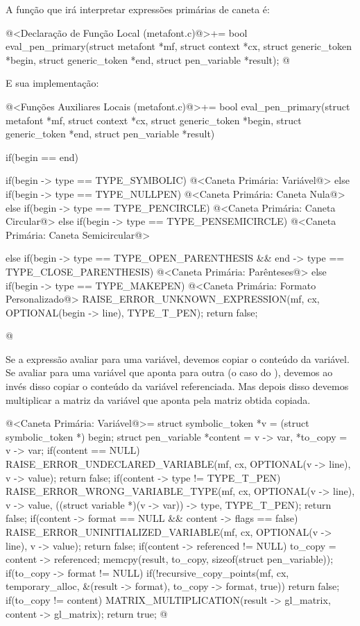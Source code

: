 {{{{{{A função que irá interpretar expressões primárias de caneta é:

\iniciocodigo
@<Declaração de Função Local (metafont.c)@>+=
bool eval_pen_primary(struct metafont *mf, struct context *cx,
                      struct generic_token *begin,
                      struct generic_token *end,
                      struct pen_variable *result);
@
\fimcodigo

E sua implementação:

\iniciocodigo
@<Funções Auxiliares Locais (metafont.c)@>+=
bool eval_pen_primary(struct metafont *mf, struct context *cx,
                      struct generic_token *begin,
                      struct generic_token *end,
                      struct pen_variable *result){
  if(begin == end){
    if(begin -> type == TYPE_SYMBOLIC){
      @<Caneta Primária: Variável@>
    }
    else if(begin -> type == TYPE_NULLPEN){
      @<Caneta Primária: Caneta Nula@>
    }
    else if(begin -> type == TYPE_PENCIRCLE){
      @<Caneta Primária: Caneta Circular@>
    }
    else if(begin -> type == TYPE_PENSEMICIRCLE){
      @<Caneta Primária: Caneta Semicircular@>
    }

  }
  else{
    if(begin -> type == TYPE_OPEN_PARENTHESIS &&
      end -> type == TYPE_CLOSE_PARENTHESIS){
      @<Caneta Primária: Parênteses@>
    }
    else if(begin -> type == TYPE_MAKEPEN){
      @<Caneta Primária: Formato Personalizado@>
    }
  }
  RAISE_ERROR_UNKNOWN_EXPRESSION(mf, cx, OPTIONAL(begin -> line),
                                 TYPE_T_PEN);
  return false;
}
@
\fimcodigo

Se a expressão avaliar para uma variável, devemos copiar o conteúdo da
variável. Se avaliar para uma variável que aponta para outra (o caso
do ), devemos ao invés disso copiar o conteúdo
da variável referenciada. Mas depois disso devemos multiplicar a
matriz da variável que aponta pela matriz obtida copiada.

\iniciocodigo
@<Caneta Primária: Variável@>=
struct symbolic_token *v = (struct symbolic_token *) begin;
struct pen_variable *content = v -> var, *to_copy = v -> var;
if(content == NULL){
  RAISE_ERROR_UNDECLARED_VARIABLE(mf, cx, OPTIONAL(v -> line), v -> value);
  return false;
}
if(content -> type != TYPE_T_PEN){
  RAISE_ERROR_WRONG_VARIABLE_TYPE(mf, cx, OPTIONAL(v -> line), v -> value, 
                                 ((struct variable *)(v -> var)) -> type,
                                 TYPE_T_PEN);
  return false;
}
if(content -> format == NULL && content -> flags == false){
  RAISE_ERROR_UNINITIALIZED_VARIABLE(mf, cx, OPTIONAL(v -> line), v -> value);
  return false;
}
if(content -> referenced != NULL)
  to_copy = content -> referenced;
memcpy(result, to_copy, sizeof(struct pen_variable));
if(to_copy -> format != NULL)
  if(!recursive_copy_points(mf, cx, temporary_alloc, &(result -> format),
                        to_copy -> format, true))
    return false;
if(to_copy != content)
  MATRIX_MULTIPLICATION(result -> gl_matrix, content -> gl_matrix);
return true;
@
\fimcodigo

}}}}}}

